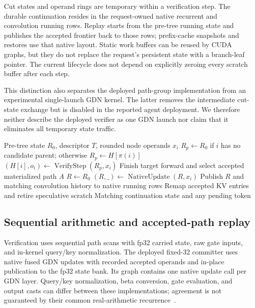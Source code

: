 \documentclass[conference]{IEEEtran}
\begin{document}
Cut states and operand rings are temporary within a verification step. The durable continuation resides in the request-owned native recurrent and convolution running rows. Replay starts from the pre-tree running state and publishes the accepted frontier back to those rows; prefix-cache snapshots and restores use that native layout. Static work buffers can be reused by CUDA graphs, but they do not replace the request's persistent state with a branch-leaf pointer. The current lifecycle does not depend on explicitly zeroing every scratch buffer after each step.

This distinction also separates the deployed path-group implementation from an experimental single-launch GDN kernel. The latter removes the intermediate cut-state exchange but is disabled in the reported agent deployment. We therefore neither describe the deployed verifier as one GDN launch nor claim that it eliminates all temporary state traffic.

\begin{algorithm}[t]
\caption{Logical recurrence and selected-path publication. The implementation groups independent paths into GPU launches and retains only their needed cut states.}
\label{alg:scan-replay}
\begin{algorithmic}[1]
\REQUIRE Pre-tree state $R_0$, descriptor $T$, rounded node operands $x_i$
\STATE $R_p\gets R_0$ if $i$ has no candidate parent; otherwise $R_p\gets H[\pi(i)]$
\STATE $(H[i],o_i)\gets\operatorname{VerifyStep}(R_p,x_i)$
\ENDFOR
\STATE Finish target forward and select accepted materialized path $A$
\STATE $R\gets R_0$
\STATE $(R,\_)\gets\operatorname{NativeUpdate}(R,x_i)$
\ENDFOR
\STATE Publish $R$ and matching convolution history to native running rows
\STATE Remap accepted KV entries and retire speculative scratch
\RETURN Matching continuation state and any pending token
\end{algorithmic}
\end{algorithm}

\subsection{Sequential arithmetic and accepted-path replay}
Verification uses sequential path scans with fp32 carried state, raw gate inputs, and in-kernel query/key normalization. The deployed fixed-32 committer uses native fused GDN updates with recorded accepted operands and in-place publication to the fp32 state bank. Its graph contains one native update call per GDN layer. Query/key normalization, beta conversion, gate evaluation, and output casts can differ between these implementations; agreement is not guaranteed by their common real-arithmetic recurrence~\cite{lumo2026archive}.
\end{document}
